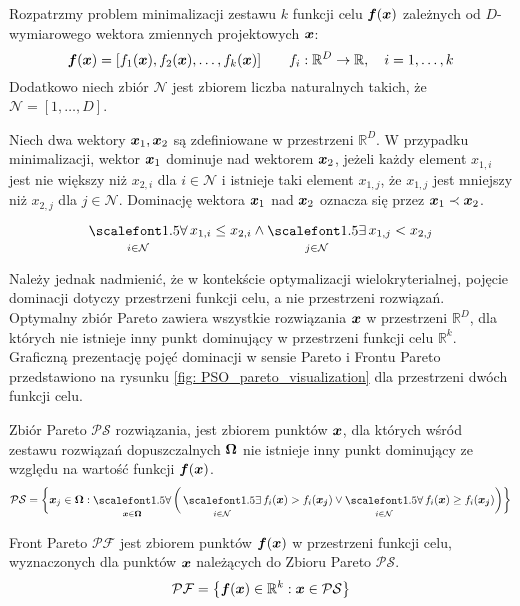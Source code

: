 Rozpatrzmy problem minimalizacji zestawu $k$ funkcji celu $\bm{f}(\bm{x})$ zależnych od $D$-wymiarowego wektora zmiennych projektowych $\bm{x}$:
\begin{equation}
	\bm{f}(\bm{x})=[f_1(\bm{x}),f_2(\bm{x}),\dots,f_k(\bm{x})] \qquad f_i:\mathbb{R}^D\rightarrow \mathbb{R},\quad i=1,\dots,k
\end{equation}
Dodatkowo niech zbiór $\mathcal{N}$ jest zbiorem liczba naturalnych takich, że $\mathcal{N}=[1,\dots,D]$.
\begin{definition}
Niech dwa wektory $\bm{x}_1, \bm{x}_2$ są zdefiniowane w przestrzeni $\mathbb{R}^D$. W przypadku minimalizacji, wektor $\bm{x}_1$ dominuje nad wektorem $\bm{x}_2$, jeżeli każdy element $x_{1,i}$ jest nie większy niż $x_{2,i}$ dla $i\in \mathcal{N}$ i istnieje taki element $x_{1,j}$, że $x_{1,j}$ jest mniejszy niż $x_{2,j}$ dla $j\in\mathcal{N}$. Dominację wektora $\bm{x}_1$ nad $\bm{x}_2$ oznacza się przez $\bm{x}_1\prec\bm{x}_2$.
\begin{equation}
	\bigforall_{i\in\mathcal{N}} x_{1,i}\le x_{2,i} \land \bigexists_{j\in\mathcal{N}} x_{1,j}<x_{2,j}
\end{equation}
\end{definition}


Należy jednak nadmienić, że w kontekście optymalizacji wielokryterialnej, pojęcie dominacji dotyczy przestrzeni funkcji celu, a nie przestrzeni rozwiązań. Optymalny zbiór Pareto zawiera wszystkie rozwiązania $\bm{x}$ w przestrzeni $\mathbb{R}^D$, dla których nie istnieje inny punkt dominujący w przestrzeni funkcji celu $\mathbb{R}^k$. Graficzną prezentację pojęć dominacji w sensie Pareto i Frontu Pareto przedstawiono na rysunku \ref{fig: PSO_pareto_visualization} dla przestrzeni dwóch funkcji celu.

\begin{definition}
	Zbiór Pareto $\mathcal{PS}$ rozwiązania, jest zbiorem punktów $\bm{x}$, dla których wśród zestawu rozwiązań dopuszczalnych $\bm{\Omega}$ nie istnieje inny punkt dominujący ze względu na wartość funkcji $\bm{f}(\bm{x})$.
	\begin{equation}
		\mathcal{PS} = \bigg\{ 
		\vect{x}_j \in \vect{\Omega}: 
		\bigforall_{\vect{x}\in\vect{\Omega}} \bigg( 
		\bigexists_{i\in\mathcal{N}} f_i(\vect{x})>f_i(\vect{x_j}) \vee
		\bigforall_{i\in\mathcal{N}} f_i(\vect{x})\ge f_i(\vect{x_j})
		\bigg) \bigg\}   
	\end{equation}
\end{definition}
\begin{definition}
	Front Pareto $\mathcal{PF}$ jest zbiorem punktów $\bm{f}(\bm{x})$ w przestrzeni funkcji celu, wyznaczonych dla punktów $\bm{x}$ należących do Zbioru Pareto $\mathcal{PS}$.
	\begin{equation}
		\mathcal{PF} = \big\{ \bm{f}(\bm{x}) \in \mathbb{R}^k: \bm{x}\in \mathcal{PS} \big\}  
	\end{equation}
\end{definition}

